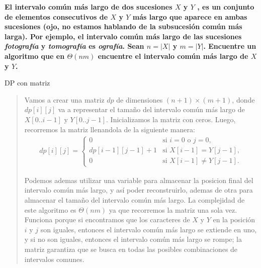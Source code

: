 \textbf{El intervalo común más largo de dos sucesiones $X$ y $Y$ , es un conjunto de elementos consecutivos de $X$ y $Y$ más largo que aparece en ambas sucesiones (ojo, no estamos hablando de la subsucesión común más larga). Por ejemplo, el intervalo común más largo de las sucesiones \textit{fotografía} y \textit{tomografía} es \textit{ografía}. Sean $n = |X|$ y $m = |Y|$. Encuentre un algoritmo que en $\Theta(nm)$ encuentre el intervalo común más largo de $X$ y $Y$.}\vspace{.2cm}

\textcolor{bibi}{DP con matriz}
\begin{quote}
    Vamos a crear una matriz $dp$ de dimensiones $(n+1) \times (m+1)$, donde $dp[i][j]$ va a representar el tamaño del intervalo común más largo de $X[0..i-1]$ y $Y[0..j-1]$. Inicializamos la matriz con ceros. Luego, recorremos la matriz llenandola de la siguiente manera: 
    \begin{align*}
        dp[i][j] = \begin{cases}
            0 & \text{si } i = 0 \text{ o } j = 0,\\
            dp[i-1][j-1] + 1 & \text{si } X[i-1] = Y[j-1],\\
            0 & \text{si } X[i-1] \neq Y[j-1].
        \end{cases}
    \end{align*}

    Podemos ademas utilizar una variable para almacenar la posicion final del intervalo común más largo, y así poder reconstruirlo, ademas de otra para almacenar el tamaño del intervalo común más largo. La complejidad de este algoritmo es $\Theta(nm)$ ya que recorremos la matriz una sola vez. Funciona porque si encontramos que los caracteres de $X$ y $Y$ en la posición $i$ y $j$ son iguales, entonces el intervalo común más largo se extiende en uno, y si no son iguales, entonces el intervalo común más largo se rompe; la matriz garantiza que se busca en todas las posibles combinaciones de intervalos comunes. \vspace{.2cm}


\end{quote}
